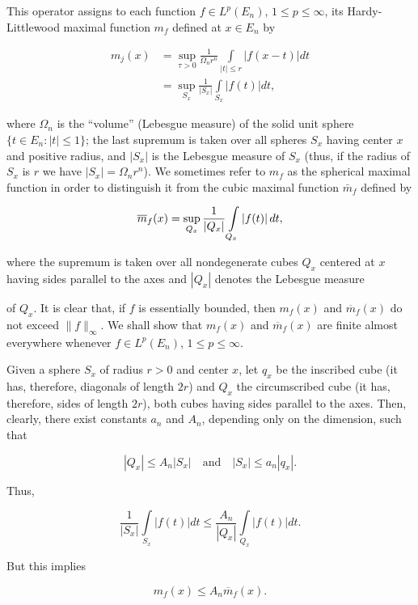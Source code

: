 This operator assigns to each function $f \in L^p(E_n)$, $1 \leq p \leq \infty$, its Hardy-Littlewood maximal function $m_f$ defined at $x \in E_n$ by

\[
\begin{aligned}m_{j}(x)&=\sup_{\tau>0}\frac{1}{\Omega_{n} r^{n}}\int\limits_{|t|\leq r}\left|f(x-t)\right|dt\\&=\sup_{S_{x}}\frac{1}{\left|S_{x}\right|}\int\limits_{S_{x}}\left|f(t)\right|dt,\end{aligned}
\]

where $\Omega_n$ is the ``volume'' (Lebesgue measure) of the solid unit sphere $\{t \in E_n: |t| \leq 1\}$; the last supremum is taken over all spheres $S_x$ having center $x$ and positive radius, and $|S_x|$ is the Lebesgue measure of $S_x$ (thus, if the radius of $S_x$ is $r$ we have $|S_x| = \Omega_n r^n$). We sometimes refer to $m_f$ as the spherical maximal function in order to distinguish it from the cubic maximal function $\bar{m}_f$ defined by

\[
\overline{{m}}_{f}(x)=\sup_{Q_{x}}\frac{1}{\left|Q_{x}\right|}\intop_{Q_{x}}\left|f(t)\right|dt,
\]

where the supremum is taken over all nondegenerate cubes $Q_x$ centered at $x$ having sides parallel to the axes and $|Q_x|$ denotes the Lebesgue measure

of $Q_x$. It is clear that, if $f$ is essentially bounded, then $m_f(x)$ and $\overline{m}_f(x)$ do not exceed $\|f\|_\infty$. We shall show that $m_f(x)$ and $\overline{m}_f(x)$ are finite almost everywhere whenever $f\in L^p(E_n)$, $1\leq p\leq\infty$.

Given a sphere $S_x$ of radius $r > 0$ and center $x$, let $q_x$ be the inscribed cube (it has, therefore, diagonals of length $2r$) and $Q_x$ the circumscribed cube (it has, therefore, sides of length $2r$), both cubes having sides parallel to the axes. Then, clearly, there exist constants $a_n$ and $A_n$, depending only on the dimension, such that

\[
|Q_{x}|\leq A_{n}|S_{x}|\quad\text{and}\quad|S_{x}|\leq a_{n}|q_{x}|.
\]

Thus,

\[
\frac{1}{\left|S_{x}\right|}\int\limits_{S_{x}}\left|f(t)\right|dt\leq\frac{A_{n}}{\left|Q_{x}\right|}\int\limits_{Q_{x}}\left|f(t)\right|dt.
\]

But this implies

\begin{equation}\label{eq:c2-3-2}
m_{f}(x)\leq A_{n}\overline{{m}}_{f}(x).
\end{equation}

